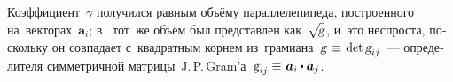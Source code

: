 \begin{otherlanguage}{russian}
\vspace{0.05em}\noindent Коэффициент~$\gamma$ получился равным объёму параллелепипеда, построенного на~векторах~$\bm{a}_i$; в~ тот~же объём был представлен как~\!${\sqrt{\hspace{-0.36ex}\mathstrut{\textsl{g}}}\hspace{0.16ex}}$, и~это неспроста, поскольку он совпадает с~квадратным корнем из~грамиана~\hbox{$\textsl{g} \hspace{0.1ex} \hspace{0.25ex} \equiv \hspace{0.2ex} \operatorname{det} \textsl{g}_{ij}$\hspace{-0.12ex}}~--- определителя симметричной матрицы~\hbox{J.\,P.\,Gram’а}~${\textsl{g}_{ij} \hspace{-0.1ex} \hspace{0.16ex} \equiv \hspace{0.2ex} \bm{a}_i \dotp \bm{a}_j}$.



\end{otherlanguage}
